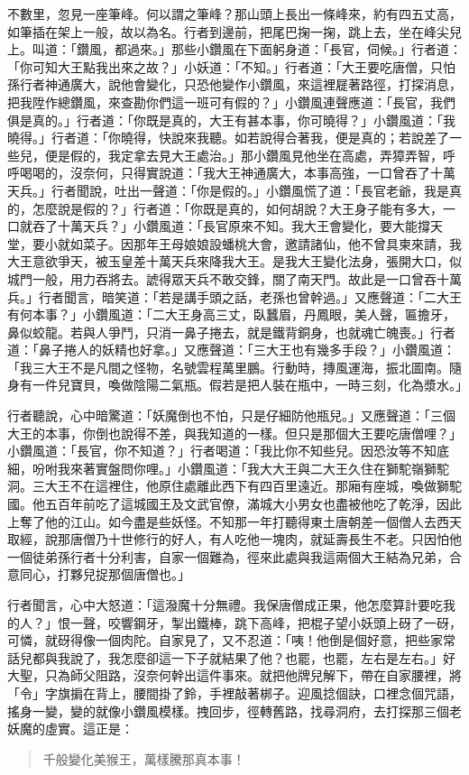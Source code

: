 不數里，忽見一座筆峰。何以謂之筆峰？那山頭上長出一條峰來，約有四五丈高，如筆插在架上一般，故以為名。行者到邊前，把尾巴掬一掬，跳上去，坐在峰尖兒上。叫道：「鑽風，都過來。」那些小鑽風在下面躬身道：「長官，伺候。」行者道：「你可知大王點我出來之故？」小妖道：「不知。」行者道：「大王要吃唐僧，只怕孫行者神通廣大，說他會變化，只恐他變作小鑽風，來這裡屣著路徑，打探消息，把我陞作總鑽風，來查勘你們這一班可有假的？」小鑽風連聲應道：「長官，我們俱是真的。」行者道：「你既是真的，大王有甚本事，你可曉得？」小鑽風道：「我曉得。」行者道：「你曉得，快說來我聽。如若說得合著我，便是真的；若說差了一些兒，便是假的，我定拿去見大王處治。」那小鑽風見他坐在高處，弄獐弄智，呼呼喝喝的，沒奈何，只得實說道：「我大王神通廣大，本事高強，一口曾吞了十萬天兵。」行者聞說，吐出一聲道：「你是假的。」小鑽風慌了道：「長官老爺，我是真的，怎麼說是假的？」行者道：「你既是真的，如何胡說？大王身子能有多大，一口就吞了十萬天兵？」小鑽風道：「長官原來不知。我大王會變化，要大能撐天堂，要小就如菜子。因那年王母娘娘設蟠桃大會，邀請諸仙，他不曾具柬來請，我大王意欲爭天，被玉皇差十萬天兵來降我大王。是我大王變化法身，張開大口，似城門一般，用力吞將去。諕得眾天兵不敢交鋒，關了南天門。故此是一口曾吞十萬兵。」行者聞言，暗笑道：「若是講手頭之話，老孫也曾幹過。」又應聲道：「二大王有何本事？」小鑽風道：「二大王身高三丈，臥蠶眉，丹鳳眼，美人聲，匾擔牙，鼻似蛟龍。若與人爭鬥，只消一鼻子捲去，就是鐵背銅身，也就魂亡魄喪。」行者道：「鼻子捲人的妖精也好拿。」又應聲道：「三大王也有幾多手段？」小鑽風道：「我三大王不是凡間之怪物，名號雲程萬里鵬。行動時，摶風運海，振北圖南。隨身有一件兒寶貝，喚做陰陽二氣瓶。假若是把人裝在瓶中，一時三刻，化為漿水。」

行者聽說，心中暗驚道：「妖魔倒也不怕，只是仔細防他瓶兒。」又應聲道：「三個大王的本事，你倒也說得不差，與我知道的一樣。但只是那個大王要吃唐僧哩？」小鑽風道：「長官，你不知道？」行者喝道：「我比你不知些兒。因恐汝等不知底細，吩咐我來著實盤問你哩。」小鑽風道：「我大大王與二大王久住在獅駝嶺獅駝洞。三大王不在這裡住，他原住處離此西下有四百里遠近。那廂有座城，喚做獅駝國。他五百年前吃了這城國王及文武官僚，滿城大小男女也盡被他吃了乾淨，因此上奪了他的江山。如今盡是些妖怪。不知那一年打聽得東土唐朝差一個僧人去西天取經，說那唐僧乃十世修行的好人，有人吃他一塊肉，就延壽長生不老。只因怕他一個徒弟孫行者十分利害，自家一個難為，徑來此處與我這兩個大王結為兄弟，合意同心，打夥兒捉那個唐僧也。」

行者聞言，心中大怒道：「這潑魔十分無禮。我保唐僧成正果，他怎麼算計要吃我的人？」恨一聲，咬響鋼牙，掣出鐵棒，跳下高峰，把棍子望小妖頭上砑了一砑，可憐，就砑得像一個肉陀。自家見了，又不忍道：「咦！他倒是個好意，把些家常話兒都與我說了，我怎麼卻這一下子就結果了他？也罷，也罷，左右是左右。」好大聖，只為師父阻路，沒奈何幹出這件事來。就把他牌兒解下，帶在自家腰裡，將「令」字旗掮在背上，腰間掛了鈴，手裡敲著梆子。迎風捻個訣，口裡念個咒語，搖身一變，變的就像小鑽風模樣。拽回步，徑轉舊路，找尋洞府，去打探那三個老妖魔的虛實。這正是：
\begin{quote}
千般變化美猴王，萬樣騰那真本事！
\end{quote}

